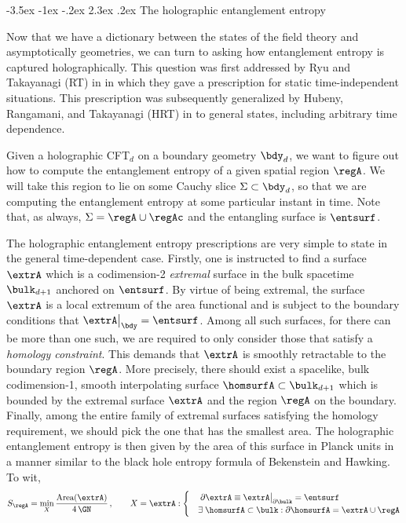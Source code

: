 \documentclass[12pt,openany]{book}
\makeatletter
\renewcommand\section{\@startsection {section}{1}{\z@}%
                                   {-3.5ex \@plus -1ex \@minus -.2ex}%
                                   {2.3ex \@plus.2ex}%
                                   {\normalfont\large\bfseries}}
\makeatother
\begin{document}
\section{The holographic entanglement entropy}
\label{sec:hrrt}

Now that we have a dictionary between the states of the field theory and asymptotically \AdS{} geometries, we can turn to asking how entanglement entropy is captured holographically. This question was first addressed by Ryu and Takayanagi (RT) in \cite{Ryu:2006bv,Ryu:2006ef} in which they gave a prescription for static time-independent situations. This prescription was subsequently generalized by Hubeny, Rangamani, and Takayanagi (HRT) in \cite{Hubeny:2007xt} to general states, including arbitrary time dependence.

Given a holographic CFT$_d$ on a boundary geometry $\bdy_d$, we want to figure out how to compute the entanglement entropy of a given spatial region $\regA$. We will take this region to lie on some Cauchy slice $\Sigma \subset \bdy_d$, so that we are computing the entanglement entropy at some particular instant in time. Note that, as always, $\Sigma = \regA \cup \regAc$ and the entangling surface is $\entsurf$.

The holographic entanglement entropy prescriptions are very simple to state in the general time-dependent case. Firstly, one is instructed to find a surface $\extrA$ which is a codimension-2 \emph{extremal} surface in the bulk spacetime $\bulk_{d+1}$ anchored on $\entsurf$. By virtue of being extremal, the surface $\extrA$ is a local extremum of the area functional and is subject to the boundary conditions that $\extrA \big|_\bdy = \entsurf$.  Among all such surfaces, for there can be more than one such, we are required to only consider those that satisfy a \emph{homology constraint}. This demands that $\extrA$ is smoothly retractable to the boundary region $\regA$. More precisely, there should exist a spacelike, bulk codimension-1, 
smooth  interpolating surface  $\homsurfA \subset \bulk_{d+1}$
which is bounded by the extremal surface $\extrA$ and the region $\regA$ on the boundary. Finally, among the entire family of extremal surfaces satisfying the homology requirement, we should pick the one that has the smallest area.  The holographic entanglement entropy is then given by the area of this surface in Planck units in a manner similar to the black hole entropy formula of Bekenstein and Hawking. To wit,
%
\begin{align}
S_\regA = \min_X \frac{\text{Area}(\extrA)}{4\,\GN} \,, \qquad  X =  \extrA:
  \begin{cases}
    & \; \partial \extrA\equiv \extrA\big|_{\partial \bulk} = \entsurf
    \\
    &
    \exists \;\homsurfA \subset \bulk : \partial \homsurfA= \extrA \cup \regA \\
    \end{cases}
\label{eq:HRTprop}
\end{align}
%
\end{document}
